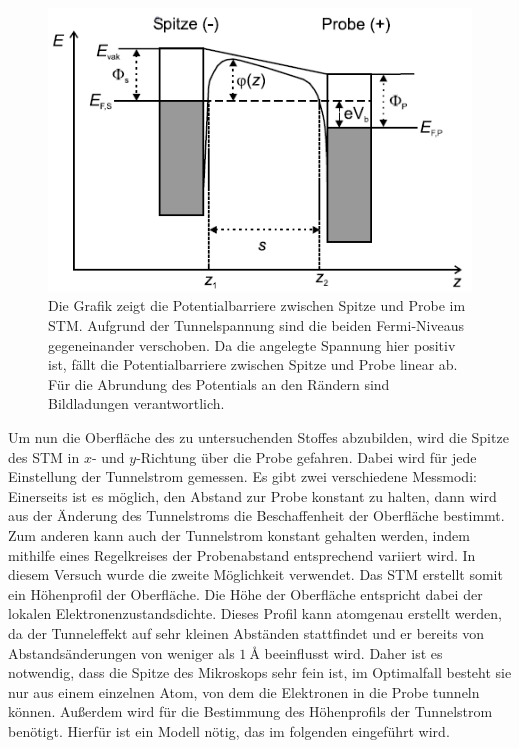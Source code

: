 \documentclass[
	a4paper,
	12pt,
	pagesize,
	ngerman
]{scrartcl}
\begin{document}
\begin{figure}[h!]
	\centering
	\includegraphics[scale = 1.2]{barrier.png}
	\caption{Die Grafik zeigt die Potentialbarriere zwischen Spitze und Probe im STM. Aufgrund der Tunnelspannung sind die beiden Fermi-Niveaus gegeneinander verschoben. Da die angelegte Spannung hier positiv ist, fällt die Potentialbarriere zwischen Spitze und Probe linear ab. Für die Abrundung des Potentials an den Rändern sind Bildladungen verantwortlich.}
	\label{barrier}
\end{figure}

Um nun die Oberfläche des zu untersuchenden Stoffes abzubilden, wird die Spitze des STM in $x$- und $y$-Richtung über die Probe gefahren. Dabei wird für jede Einstellung der Tunnelstrom gemessen. Es gibt zwei verschiedene Messmodi: Einerseits ist es möglich, den Abstand zur Probe konstant zu halten, dann wird aus der Änderung des Tunnelstroms die Beschaffenheit der Oberfläche bestimmt. Zum anderen kann auch der Tunnelstrom konstant gehalten werden, indem mithilfe eines Regelkreises der Probenabstand entsprechend variiert wird. In diesem Versuch wurde die zweite Möglichkeit verwendet. Das STM erstellt somit ein Höhenprofil der Oberfläche. Die Höhe der Oberfläche entspricht dabei der lokalen Elektronenzustandsdichte. Dieses Profil kann atomgenau erstellt werden, da der Tunneleffekt auf sehr kleinen Abständen stattfindet und er bereits von Abstandsänderungen von weniger als $\SI{1}{\angstrom}$ beeinflusst wird. Daher ist es notwendig, dass die Spitze des Mikroskops sehr fein ist, im Optimalfall besteht sie nur aus einem einzelnen Atom, von dem die Elektronen in die Probe tunneln können. Außerdem wird für die Bestimmung des Höhenprofils der Tunnelstrom benötigt. Hierfür ist ein Modell nötig, das im folgenden eingeführt wird.
\end{document}
